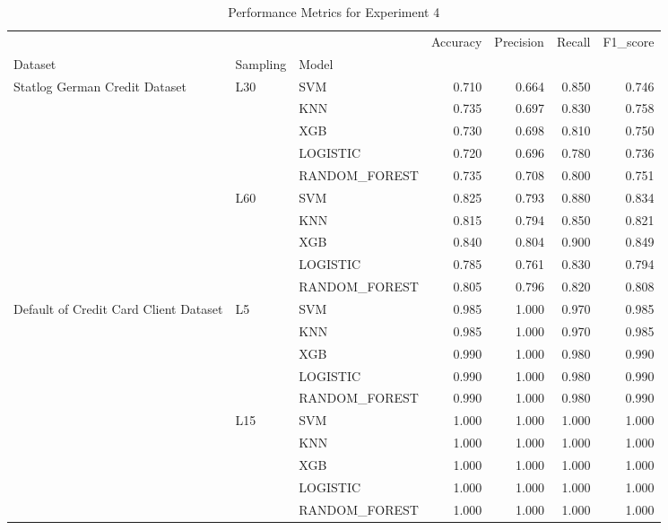 \begin{table}
\caption{Performance Metrics for Experiment 4}
\label{tab:experiment_4_results}
\begin{tabular}{lllrrrr}
\toprule
 &  &  & Accuracy & Precision & Recall & F1\_score \\
Dataset & Sampling & Model &  &  &  &  \\
\midrule
\multirow[t]{10}{*}{Statlog German Credit Dataset} & \multirow[t]{5}{*}{L30} & SVM & 0.710 & 0.664 & 0.850 & 0.746 \\
 &  & KNN & 0.735 & 0.697 & 0.830 & 0.758 \\
 &  & XGB & 0.730 & 0.698 & 0.810 & 0.750 \\
 &  & LOGISTIC & 0.720 & 0.696 & 0.780 & 0.736 \\
 &  & RANDOM\_FOREST & 0.735 & 0.708 & 0.800 & 0.751 \\
\cline{2-7}
 & \multirow[t]{5}{*}{L60} & SVM & 0.825 & 0.793 & 0.880 & 0.834 \\
 &  & KNN & 0.815 & 0.794 & 0.850 & 0.821 \\
 &  & XGB & 0.840 & 0.804 & 0.900 & 0.849 \\
 &  & LOGISTIC & 0.785 & 0.761 & 0.830 & 0.794 \\
 &  & RANDOM\_FOREST & 0.805 & 0.796 & 0.820 & 0.808 \\
\cline{1-7} \cline{2-7}
\multirow[t]{10}{*}{Default of Credit Card Client Dataset} & \multirow[t]{5}{*}{L5} & SVM & 0.985 & 1.000 & 0.970 & 0.985 \\
 &  & KNN & 0.985 & 1.000 & 0.970 & 0.985 \\
 &  & XGB & 0.990 & 1.000 & 0.980 & 0.990 \\
 &  & LOGISTIC & 0.990 & 1.000 & 0.980 & 0.990 \\
 &  & RANDOM\_FOREST & 0.990 & 1.000 & 0.980 & 0.990 \\
\cline{2-7}
 & \multirow[t]{5}{*}{L15} & SVM & 1.000 & 1.000 & 1.000 & 1.000 \\
 &  & KNN & 1.000 & 1.000 & 1.000 & 1.000 \\
 &  & XGB & 1.000 & 1.000 & 1.000 & 1.000 \\
 &  & LOGISTIC & 1.000 & 1.000 & 1.000 & 1.000 \\
 &  & RANDOM\_FOREST & 1.000 & 1.000 & 1.000 & 1.000 \\
\cline{1-7} \cline{2-7}
\bottomrule
\end{tabular}
\end{table}
